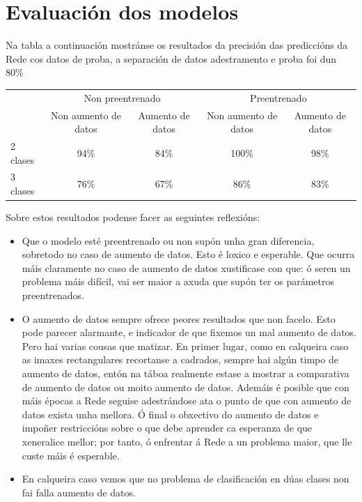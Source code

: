 \documentclass{article}
\begin{document}
\newpage
\section{Evaluación dos modelos}

Na tabla a continuación mostránse os resultados da precisión das prediccións da Rede cos datos de proba, a separación de datos adestramento e proba foi dun 80\%

\begin{table}[H]
\begin{tabular}{l|cc|cc|}
\cline{2-5}
                               & \multicolumn{2}{c|}{Non preentrenado}                        & \multicolumn{2}{c|}{Preentrenado}                            \\ \cline{2-5} 
                               & \multicolumn{1}{c|}{Non aumento de datos} & Aumento de datos & \multicolumn{1}{c|}{Non aumento de datos} & Aumento de datos \\ \hline
\multicolumn{1}{|l|}{2 clases} & \multicolumn{1}{c|}{94\%}                 & 84\%             & \multicolumn{1}{c|}{100\%}                & 98\%             \\ \hline
\multicolumn{1}{|l|}{3 clases} & \multicolumn{1}{c|}{76\%}                 & 67\%             & \multicolumn{1}{c|}{86\%}                 & 83\%             \\ \hline
\end{tabular}
\end{table}

Sobre estos resultados podense facer as seguintes reflexións:
\begin{itemize}
	\item Que o modelo esté preentrenado ou non supón unha gran diferencia, sobretodo no caso de aumento de datos. Esto é loxico e esperable. Que ocurra máis claramente no caso de aumento de datos xustificase con que: ó seren un problema máis difícil, vai ser maior a axuda que supón ter os parámetros preentrenados.
	\item O aumento de datos sempre ofrece peores resultados que non facelo. Esto pode parecer alarmante, e indicador de que fixemos un mal aumento de datos. Pero hai varias cousas que matizar. En primer lugar, como en calqueira caso as imaxes rectangulares recortanse a cadrados, sempre hai algún timpo de aumento de datos, entón na táboa realmente estase a mostrar a comparativa de aumento de datos ou moito aumento de datos. Ademáis é posible que con máis épocas a Rede seguise adestrándose ata o punto de que con aumento de datos exista unha mellora. Ó final o obxectivo do aumento de datos e impoñer restriccións sobre o que debe aprender ca esperanza de que xeneralice mellor; por tanto, ó enfrentar á Rede a un problema maior, que lle custe máis é esperable.
	\item En calqueira caso vemos que no problema de clasificación en dúas clases non fai falla aumento de datos.
\end{itemize}
\end{document}
